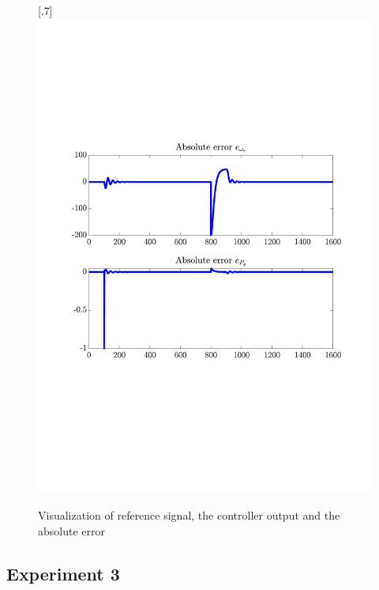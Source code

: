 \begin{figure}[H]
[.7\textwidth]{\includegraphics[width=1\linewidth, scale=1, trim=55 230 55 120,clip]{fig/Open_loop/exp_2_error.pdf}}
    \caption{Visualization of reference signal, the controller output and the absolute error}
    \label{fig:app:cl_results:exp2}
\end{figure}


\subsection{Experiment 3}


